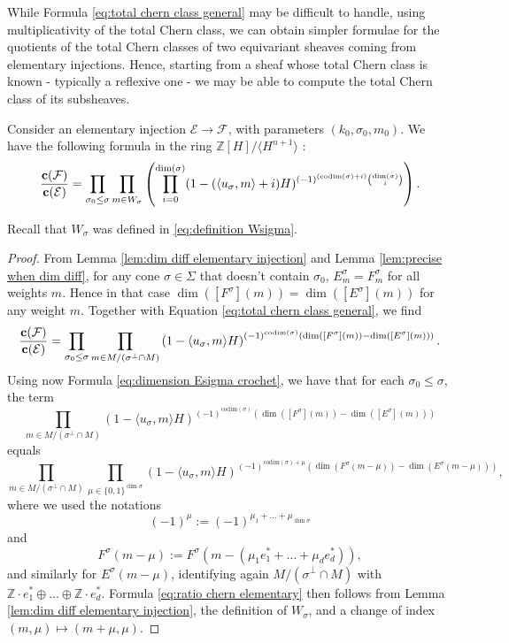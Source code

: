 \documentclass[a4paper,10pt]{amsart}
\theoremstyle{plain}{
    \newtheorem{theorem}{Theorem}[section]
    \newtheorem{lemma}[theorem]{Lemma}
    \newtheorem{corollary}[theorem]{Corollary}
    \newtheorem{proposition}[theorem]{Proposition}
    \newtheorem{conjecture}[theorem]{Conjecture}
}
\theoremstyle{definition}{
    \newtheorem{definition}[theorem]{Definition}
    \newtheorem{defn-thm}[theorem]{Definition-Theorem}
    \newtheorem{example}[theorem]{Example}
    \newtheorem{notation}[theorem]{Notation}
}
\theoremstyle{remark}{
    \newtheorem{remark}[theorem]{Remark}
    \newtheorem{problem}[theorem]{Problem}
    \newtheorem{question}[theorem]{Question}
}
\def\uc{{\bf c}}
\def\cF{\mathcal{F}}
\def\cE{\mathcal{E}}
\def\Z{\mathbb{Z}}
\def\codim{\mathrm{codim}}
\begin{document}
While Formula \eqref{eq:total chern class general} may be difficult to handle, using multiplicativity of the total Chern class, we can obtain simpler formulae for the quotients of the total Chern classes of two equivariant sheaves coming from elementary injections. Hence, starting from a sheaf whose total Chern class is known - typically a reflexive one - we may be able to compute the total Chern class of its subsheaves. 
\begin{proposition}
 \label{prop:ratio elementary injection}
 Consider an elementary injection $\cE\to \cF$, with parameters $(k_0,\sigma_0,m_0)$. We have the following formula in the ring $\Z[H]/\langle H^{n+1}\rangle$ :
 \begin{equation}
  \label{eq:ratio chern elementary}
  \frac{\uc(\cF)}{\uc(\cE)}=\prod_{\sigma_0\leq\sigma}\prod_{m\in W_\sigma}\left(\prod_{i=0}^{\dim(\sigma)}(1-(\langle u_\sigma,m\rangle+i)H)^{(-1)^{(\codim(\sigma)+i)}\binom{\dim(\sigma)}{i}}\right).
 \end{equation}
\end{proposition}
Recall that $W_\sigma$ was defined in \eqref{eq:definition Wsigma}.
\begin{proof}
From Lemma \ref{lem:dim diff elementary injection} and Lemma \ref{lem:precise when dim diff}, for any cone $\sigma\in\Sigma$ that doesn't contain $\sigma_0$, $E^\sigma_m=F^\sigma_m$ for all weights $m$. Hence in that case $\dim\left( [F^\sigma](m)\right)= \dim\left( [E^\sigma](m)\right)$ for any weight $m$. Together with Equation \eqref{eq:total chern class general},  we find
 $$
 \frac{\uc(\cF)}{\uc(\cE)}=\prod_{\sigma_0\leq\sigma}\prod_{m\in M/(\sigma^\perp\cap M)} \left(1-\langle u_\sigma, m \rangle H\right)^{(-1)^{\codim(\sigma)}\left(\dim\left( [F^\sigma](m)\right)- \dim\left( [E^\sigma](m)\right)\right)}.
 $$
 Using now Formula \eqref{eq:dimension Esigma crochet}, we have that for each $\sigma_0\leq\sigma$, the term
 $$
 \displaystyle\prod_{m\in M/(\sigma^\perp\cap M)} \left(1-\langle u_\sigma, m \rangle H\right)^{(-1)^{\codim(\sigma)}\left(\dim\left( [F^\sigma](m)\right)- \dim\left( [E^\sigma](m)\right)\right)}
 $$
 equals
 \begin{equation*}
 \label{eq:change of index}
  \displaystyle\prod_{m\in M/(\sigma^\perp\cap M)}\prod_{\mu\in\lbrace 0,1\rbrace^{\dim\sigma}} \left(1-\langle u_\sigma, m \rangle H\right)^{(-1)^{\codim(\sigma)+\mu}\left(\dim\left( F^\sigma(m-\mu)\right)- \dim\left( E^\sigma(m-\mu)\right)\right)},
 \end{equation*}
 where we used the notations
 $$
 (-1)^\mu:=(-1)^{\mu_1+\ldots+\mu_{\dim\sigma}}
 $$
 and
 $$
 F^\sigma(m-\mu):=F^\sigma(m-(\mu_1e_1^*+\ldots+\mu_de_d^*)),
 $$
 and similarly for $E^\sigma(m-\mu)$, identifying again
 $M/(\sigma^\perp\cap M)$ with $\Z\cdot e_1^*\oplus\ldots\oplus \Z\cdot e_d^*$. Formula \eqref{eq:ratio chern elementary} then follows from Lemma \ref{lem:dim diff elementary injection}, the definition of $W_\sigma$, and a change of index $(m,\mu)\mapsto (m+\mu,\mu)$.
\end{proof}
\end{document}
